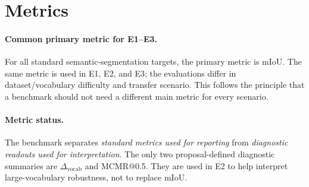 \documentclass[11pt,a4paper]{article}
\begin{document}
\section{Metrics}

\paragraph{Common primary metric for E1--E3.}
For all standard semantic-segmentation targets, the primary metric is mIoU. The same metric is used in E1, E2, and E3; the evaluations differ in dataset/vocabulary difficulty and transfer scenario. This follows the principle that a benchmark should not need a different main metric for every scenario.

\paragraph{Metric status.}
The benchmark separates \emph{standard metrics used for reporting} from \emph{diagnostic readouts used for interpretation}. The only two proposal-defined diagnostic summaries are $\Delta_{\mathrm{vocab}}$ and MCMR@0.5. They are used in E2 to help interpret large-vocabulary robustness, not to replace mIoU.
\end{document}
